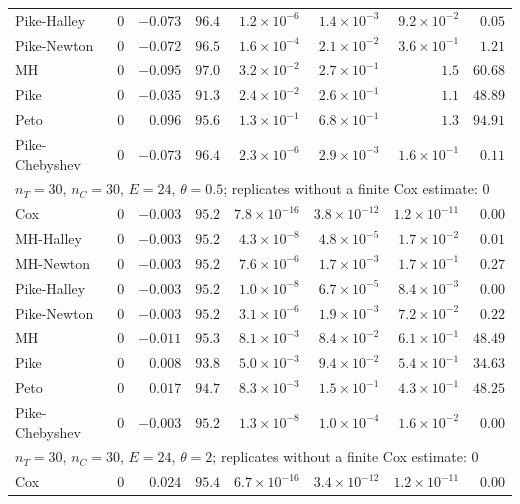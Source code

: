 \begin{landscape}
\begin{longtable}{lrrrrrrr}
Pike-Halley & 0 & $-0.073$ & $96.4$ & $1.2 \times 10^{-6}$ & $1.4 \times 10^{-3}$ & $9.2 \times 10^{-2}$ & $0.05$ \\
Pike-Newton & 0 & $-0.072$ & $96.5$ & $1.6 \times 10^{-4}$ & $2.1 \times 10^{-2}$ & $3.6 \times 10^{-1}$ & $1.21$ \\
MH & 0 & $-0.095$ & $97.0$ & $3.2 \times 10^{-2}$ & $2.7 \times 10^{-1}$ & $1.5$ & $60.68$ \\
Pike & 0 & $-0.035$ & $91.3$ & $2.4 \times 10^{-2}$ & $2.6 \times 10^{-1}$ & $1.1$ & $48.89$ \\
Peto & 0 & $0.096$ & $95.6$ & $1.3 \times 10^{-1}$ & $6.8 \times 10^{-1}$ & $1.3$ & $94.91$ \\
Pike-Chebyshev & 0 & $-0.073$ & $96.4$ & $2.3 \times 10^{-6}$ & $2.9 \times 10^{-3}$ & $1.6 \times 10^{-1}$ & $0.11$ \\
\multicolumn{8}{l}{$n_T = 30$, $n_C = 30$, $E = 24$, $\theta = 0.5$; replicates without a finite Cox estimate: 0} \\
Cox & 0 & $-0.003$ & $95.2$ & $7.8 \times 10^{-16}$ & $3.8 \times 10^{-12}$ & $1.2 \times 10^{-11}$ & $0.00$ \\
MH-Halley & 0 & $-0.003$ & $95.2$ & $4.3 \times 10^{-8}$ & $4.8 \times 10^{-5}$ & $1.7 \times 10^{-2}$ & $0.01$ \\
MH-Newton & 0 & $-0.003$ & $95.2$ & $7.6 \times 10^{-6}$ & $1.7 \times 10^{-3}$ & $1.7 \times 10^{-1}$ & $0.27$ \\
Pike-Halley & 0 & $-0.003$ & $95.2$ & $1.0 \times 10^{-8}$ & $6.7 \times 10^{-5}$ & $8.4 \times 10^{-3}$ & $0.00$ \\
Pike-Newton & 0 & $-0.003$ & $95.2$ & $3.1 \times 10^{-6}$ & $1.9 \times 10^{-3}$ & $7.2 \times 10^{-2}$ & $0.22$ \\
MH & 0 & $-0.011$ & $95.3$ & $8.1 \times 10^{-3}$ & $8.4 \times 10^{-2}$ & $6.1 \times 10^{-1}$ & $48.49$ \\
Pike & 0 & $0.008$ & $93.8$ & $5.0 \times 10^{-3}$ & $9.4 \times 10^{-2}$ & $5.4 \times 10^{-1}$ & $34.63$ \\
Peto & 0 & $0.017$ & $94.7$ & $8.3 \times 10^{-3}$ & $1.5 \times 10^{-1}$ & $4.3 \times 10^{-1}$ & $48.25$ \\
Pike-Chebyshev & 0 & $-0.003$ & $95.2$ & $1.3 \times 10^{-8}$ & $1.0 \times 10^{-4}$ & $1.6 \times 10^{-2}$ & $0.00$ \\
\multicolumn{8}{l}{$n_T = 30$, $n_C = 30$, $E = 24$, $\theta = 2$; replicates without a finite Cox estimate: 0} \\
Cox & 0 & $0.024$ & $95.4$ & $6.7 \times 10^{-16}$ & $3.4 \times 10^{-12}$ & $1.2 \times 10^{-11}$ & $0.00$ \\

\end{longtable}
\end{landscape}
